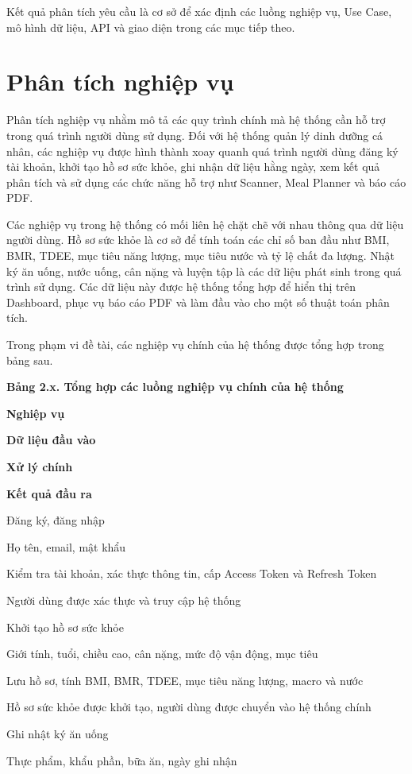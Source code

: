 \documentclass[12pt, a4paper]{report}
\begin{document}
Kết quả phân tích yêu cầu là cơ sở để xác định các luồng nghiệp vụ, Use Case, mô hình dữ liệu, API và giao diện trong các mục tiếp theo.

\section{Phân tích nghiệp vụ}Phân tích nghiệp vụ nhằm mô tả các quy trình chính mà hệ thống cần hỗ trợ trong quá trình người dùng sử dụng. Đối với hệ thống quản lý dinh dưỡng cá nhân, các nghiệp vụ được hình thành xoay quanh quá trình người dùng đăng ký tài khoản, khởi tạo hồ sơ sức khỏe, ghi nhận dữ liệu hằng ngày, xem kết quả phân tích và sử dụng các chức năng hỗ trợ như Scanner, Meal Planner và báo cáo PDF.

Các nghiệp vụ trong hệ thống có mối liên hệ chặt chẽ với nhau thông qua dữ liệu người dùng. Hồ sơ sức khỏe là cơ sở để tính toán các chỉ số ban đầu như BMI, BMR, TDEE, mục tiêu năng lượng, mục tiêu nước và tỷ lệ chất đa lượng. Nhật ký ăn uống, nước uống, cân nặng và luyện tập là các dữ liệu phát sinh trong quá trình sử dụng. Các dữ liệu này được hệ thống tổng hợp để hiển thị trên Dashboard, phục vụ báo cáo PDF và làm đầu vào cho một số thuật toán phân tích.

Trong phạm vi đề tài, các nghiệp vụ chính của hệ thống được tổng hợp trong bảng sau.

\textbf{Bảng 2.x. Tổng hợp các luồng nghiệp vụ chính của hệ thống}

\textbf{Nghiệp vụ}

\textbf{Dữ liệu đầu vào}

\textbf{Xử lý chính}

\textbf{Kết quả đầu ra}

Đăng ký, đăng nhập

Họ tên, email, mật khẩu

Kiểm tra tài khoản, xác thực thông tin, cấp Access Token và Refresh Token

Người dùng được xác thực và truy cập hệ thống

Khởi tạo hồ sơ sức khỏe

Giới tính, tuổi, chiều cao, cân nặng, mức độ vận động, mục tiêu

Lưu hồ sơ, tính BMI, BMR, TDEE, mục tiêu năng lượng, macro và nước

Hồ sơ sức khỏe được khởi tạo, người dùng được chuyển vào hệ thống chính

Ghi nhật ký ăn uống

Thực phẩm, khẩu phần, bữa ăn, ngày ghi nhận
\end{document}
